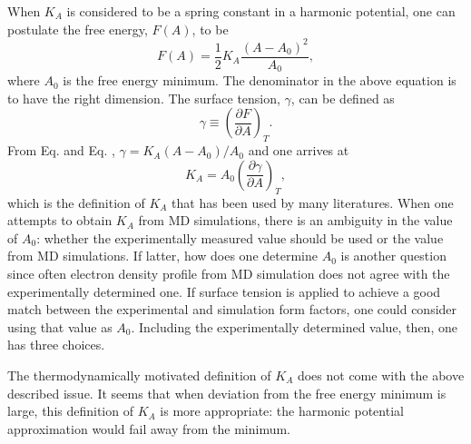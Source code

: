 \documentclass[letterpaper,12pt]{article}
\begin{document}
When $K_A$ is considered to be a spring constant in a harmonic potential, one can postulate the free energy, $F(A)$, to be
\begin{equation}
  F(A) = \frac{1}{2}K_A\frac{(A-A_0)^2}{A_0},
\end{equation}
where $A_0$ is the free energy minimum. The denominator in the above equation is to have the right dimension. The surface tension, $\gamma$, can be defined as
\begin{equation}
  \gamma \equiv \left(\frac{\partial F}{\partial A}\right)_T.
\end{equation}
From Eq. and Eq. , $\gamma = K_A(A-A_0)/A_0$ and one arrives at
\begin{equation}
  K_A = A_0\left(\frac{\partial \gamma}{\partial A}\right)_T,
\end{equation}
which is the definition of $K_A$ that has been used by many literatures.  When one attempts to obtain $K_A$ from MD simulations, there is an ambiguity in the value of $A_0$: whether the experimentally measured value should be used or the value from MD simulations. If latter, how does one determine $A_0$ is another question since often electron density profile from MD simulation does not agree with the experimentally determined one. If surface tension is applied to achieve a good match between the experimental and simulation form factors, one could consider using that value as $A_0$. Including the experimentally determined value, then, one has three choices. 

The thermodynamically motivated definition of $K_A$ does not come with the above described issue. It seems that when deviation from the free energy minimum is large, this definition of $K_A$ is more appropriate: the harmonic potential approximation would fail away from the minimum. 
\end{document}
